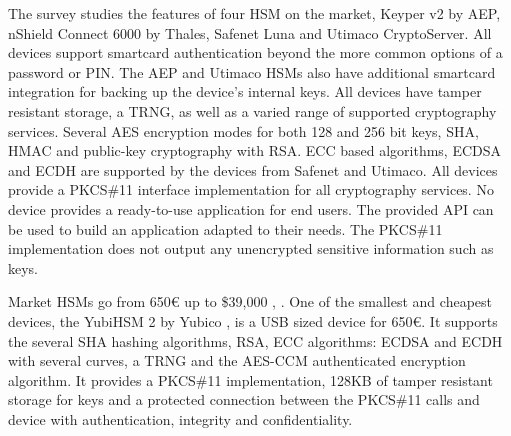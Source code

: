 The survey \cite{ivarsson2010review} studies the features of four \ac{HSM} on the market, Keyper v2 by AEP, nShield Connect 6000 by Thales, Safenet Luna and Utimaco CryptoServer.
All devices support smartcard authentication beyond the more common options of a password or PIN. The AEP and Utimaco \ac{HSM}s also have additional smartcard integration for backing up the device's internal keys.
All devices have tamper resistant storage, a \ac{TRNG}, as well as a varied range of supported cryptography services. Several AES encryption modes for both 128 and 256 bit keys, SHA, HMAC and public-key cryptography with RSA.
ECC based algorithms, ECDSA and ECDH are supported by the devices from Safenet and Utimaco.
All devices provide a PKCS\#11 interface implementation for all cryptography services. No device provides a ready-to-use application for end users. The provided API can be used to build an application adapted to their needs. The PKCS\#11 implementation does not output any unencrypted sensitive information such as keys.

Market \ac{HSM}s go from 650€ up to \$39,000 \cite{HSMpriceArticles}, \cite{HSMPresentationPrices}.
One of the smallest and cheapest devices, the YubiHSM 2 by Yubico \cite{YubiHSM2}, is a USB sized device for 650€. It supports the several SHA hashing algorithms, RSA, ECC algorithms: ECDSA and ECDH with several curves, a \ac{TRNG} and the \ac{AES}-\ac{CCM} authenticated encryption algorithm.
It provides a PKCS\#11 implementation, 128KB of tamper resistant storage for keys and a protected connection between the PKCS\#11 calls and device with authentication, integrity and confidentiality.
